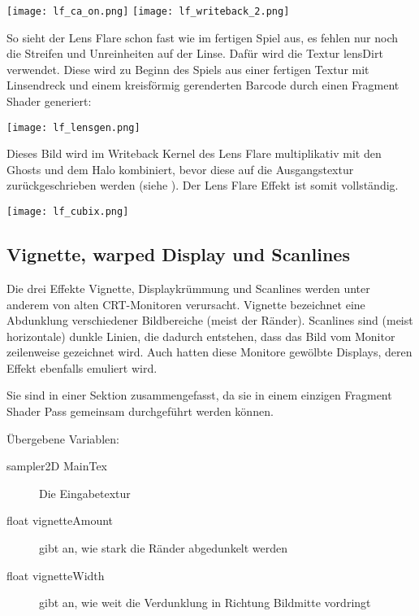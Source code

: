 \captionsetup{type=figure}
\texttt{[image: lf\_ca\_on.png]}
\texttt{[image: lf\_writeback\_2.png]}

So sieht der Lens Flare schon fast wie im fertigen Spiel aus, es fehlen nur noch die Streifen und Unreinheiten auf der Linse. Dafür wird die Textur lensDirt verwendet. Diese wird zu Beginn des Spiels aus einer fertigen Textur mit Linsendreck und einem kreisförmig gerenderten Barcode durch einen Fragment Shader generiert:

\captionsetup{type=figure}
\texttt{[image: lf\_lensgen.png]}

Dieses Bild wird im Writeback Kernel des Lens Flare multiplikativ mit den Ghosts und dem Halo kombiniert, bevor diese auf die Ausgangstextur zurückgeschrieben werden (siehe ). Der Lens Flare Effekt ist somit vollständig.

\captionsetup{type=figure}
\texttt{[image: lf\_cubix.png]}
\label{img:lfcubix}



\subsection{Vignette, warped Display und Scanlines}

Die drei Effekte Vignette, Displaykrümmung und Scanlines werden unter anderem von alten CRT-Monitoren verursacht. Vignette bezeichnet eine Abdunklung verschiedener Bildbereiche (meist der Ränder). Scanlines sind (meist horizontale) dunkle Linien, die dadurch entstehen, dass das Bild vom Monitor zeilenweise gezeichnet wird. Auch hatten diese Monitore gewölbte Displays, deren Effekt ebenfalls emuliert wird.

Sie sind in einer Sektion zusammengefasst, da sie in einem einzigen Fragment Shader Pass gemeinsam durchgeführt werden können.

Übergebene Variablen:
\begin{description}
\item[sampler2D MainTex] Die Eingabetextur
\item[float vignetteAmount] gibt an, wie stark die Ränder abgedunkelt werden
\item[float vignetteWidth] gibt an, wie weit die Verdunklung in Richtung Bildmitte vordringt
\end{description}

